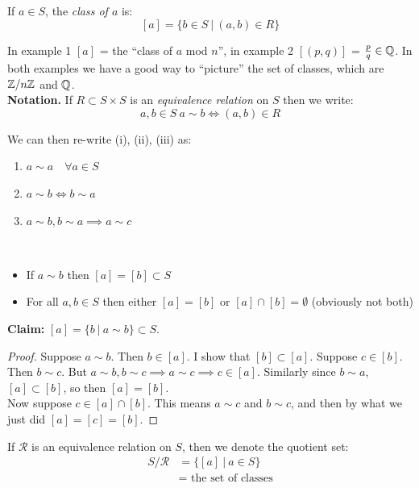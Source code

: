 \documentclass[10pt]{scrartcl}
\newcommand{\rel}{\mathcal{R}}
\begin{document}
\begin{definition}If $a \in S$, the \emph{class of $a$} is:
\[[a] = \{b \in S ~|~ (a,b) \in R\}\]
\end{definition}


In example 1 $[a]$ = the ``class of $a$ mod $n$'', in example 2 $[(p,q)]$ = $\frac{p}{q} \in \mathbb{Q}$. In both examples we have a good way to ``picture'' the set of classes, which are $\mathbb{Z} / n\mathbb{Z}$ and $\mathbb{Q}$.\\


\textbf{Notation.} If $R \subset S \times S$ is an \emph{equivalence relation} on $S$ then we write:\[a,b \in S~ a \sim b \iff (a,b) \in R\]

We can then re-write (i), (ii), (iii) as:
\begin{enumerate}
\item $a \sim a \quad \forall a\in S$	
\item $a \sim b \iff b \sim a$
\item $a \sim b, b \sim a \implies a \sim c$\\
\end{enumerate}

\begin{remarks}~
\begin{itemize}
\item If $a \sim b$ then $[a] = [b] \subset S$
\item For all $a,b\in S$ then either $[a] = [b]$ or $[a] \cap [b] = \emptyset$ (obviously not both)\\
\end{itemize}
\end{remarks}

\textbf{Claim:} 	$[a] = \{b ~|~ a \sim b\} \subset S$. 

\begin{proof}
	Suppose $a \sim b$. Then $b \in [a]$. I show that $[b] \subset [a]$. Suppose $c \in [b]$. Then $b \sim c$. But $a \sim b, b\sim c \implies a \sim c \implies c \in [a]$. Similarly since $b \sim a$, $[a] \subset [b]$, so then $[a] = [b]$.\\

Now suppose $c \in [a] \cap [b]$. This means $a \sim c$ and $b \sim c$, and then by what we just did $[a] = [c] = [b]$. 
\end{proof}\vspace*{5pt}

\begin{definition} If $\rel $ is an equivalence relation on $S$, then we denote the quotient set:
\[
\begin{aligned}
  S/\rel &= \{[a] ~|~ a \in S\}\\
  &= \text{ the set of classes}
\end{aligned}
\]
\end{definition}
\end{document}
